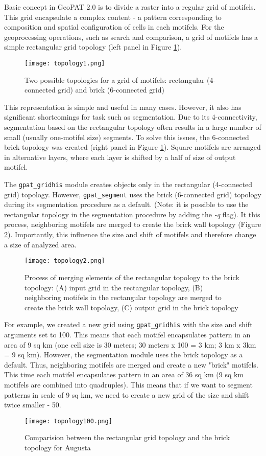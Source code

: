 
Basic concept in GeoPAT 2.0 is to divide a raster into a regular grid of motifels.
This grid encapsulate a complex content - a pattern corresponding to composition and spatial
configuration of cells in each motifels.
For the geoprocessing operations, such as search and comparison, a grid of motifels has a simple rectangular grid topology (left panel in Figure \ref{FIG:TOPO1}). 

\begin{figure}[H]
	\centering
	\texttt{[image: topology1.png]}
	\caption{Two possible topologies for a grid of motifels: rectangular (4-connected grid) and brick (6-connected grid)}
	\label{FIG:TOPO1}
\end{figure}

This representation is simple and useful in many cases.
However, it also has significant shortcomings for task such as segmentation.
Due to its 4-connectivity, segmentation based on the rectangular topology often results in a large number of small (usually one-motifel size) segments.
To solve this issues, the 6-connected brick topology was created (right panel in Figure \ref{FIG:TOPO1}).
Square motifels are arranged in alternative layers, where each layer is shifted by a half of size of output motifel.

The {\tt gpat\_gridhis} module creates objects only in the rectangular (4-connected grid) topology. 
However, {\tt gpat\_segment} uses the brick (6-connected grid) topology during its segmentation procedure as a default.
(Note: it is possible to use the rectangular topology in the segmentation procedure by adding the {\it -q} flag).
It this process, neighboring motifels are merged to create the brick wall topology (Figure \ref{FIG:TOPO2}).
Importantly, this influence the size and shift of motifels and therefore change a size of analyzed area.

\begin{figure}[H]
	\centering
	\texttt{[image: topology2.png]}
	\caption{Process of merging elements of the rectangular topology to the brick topology: (A) input grid in the rectangular topology, (B) neighboring motifels in the rectangular topology are merged to create the brick wall topology, (C) output grid in the brick topology}
	\label{FIG:TOPO2}
\end{figure}

For example, we created a new grid using {\tt gpat\_gridhis} with the size and shift arguments set to 100.
This means that each motifel encapsulates pattern in an area of 9 sq km (one cell size is 30 meters; 30 meters x 100 = 3 km; 3 km x 3km = 9 sq km).
However, the segmentation module uses the brick topology as a default.
Thus, neighboring motifels are merged and create a new "brick" motifels.
This time each motifel encapsulates pattern in an area of 36 sq km (9 sq km motifels are combined into quadruples).
This means that if we want to segment patterns in scale of 9 sq km, we need to create a new grid of the size and shift twice smaller - 50.

\begin{figure}[H]
	\centering
	\texttt{[image: topology100.png]}
	\caption{Comparision between the rectangular grid topology and the brick topology for Augusta}
	\label{FIG:TOPO3}
\end{figure}

